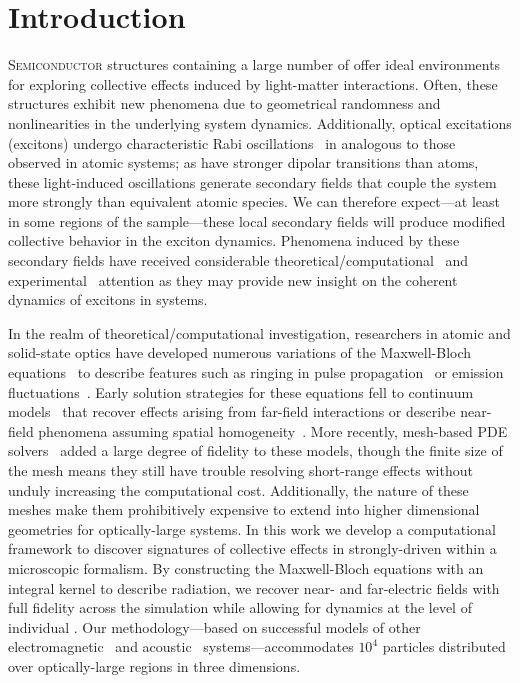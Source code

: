 \section{\label{section:introduction}Introduction}

\lettrine[lines=3, depth=1]{S}{emiconductor} structures containing a large number of \qds{} offer ideal environments for exploring collective effects induced by light-matter interactions.
Often, these structures exhibit new phenomena due to geometrical randomness and nonlinearities in the underlying system dynamics.
Additionally, optical excitations (excitons) undergo characteristic Rabi oscillations~\cite{Stievater2001,Kamada2001,Htoon2002} in \qds{} analogous to those observed in atomic systems; as \qds{} have stronger dipolar transitions than atoms, these light-induced oscillations generate secondary fields that couple the system more strongly than equivalent atomic species.
We can therefore expect---at least in some regions of the sample---these local secondary fields will produce modified collective behavior in the exciton dynamics.
Phenomena induced by these secondary fields have received considerable theoretical/computational~\cite{Slepyan2002,Slepyan2004} and experimental~\cite{Asakura2013} attention as they may provide new insight on the coherent dynamics of excitons in \qd{} systems.

In the realm of theoretical/computational investigation, researchers in atomic and solid-state optics have developed numerous variations of the Maxwell-Bloch equations~\cite{Gross1982} to describe features such as ringing in pulse propagation~\cite{Burnham1969,MacGillivray1976} or emission fluctuations~\cite{Haake1979}.
Early solution strategies for these equations fell to continuum models~\cite{Rehler1971,MacGillivray1976} that recover effects arising from far-field interactions or describe near-field phenomena assuming spatial homogeneity~\cite{Stroud1972}.
More recently, mesh-based PDE solvers~\cite{Vanneste2001,Fratalocchi2008,Bachelard2015} added a large degree of fidelity to these models, though the finite size of the mesh means they still have trouble resolving short-range effects without unduly increasing the computational cost.
Additionally, the nature of these meshes make them prohibitively expensive to extend into higher dimensional geometries for optically-large systems.
In this work we develop a computational framework to discover signatures of collective effects in strongly-driven \qds{} within a microscopic formalism.
By constructing the Maxwell-Bloch equations with an integral kernel to describe radiation, we recover near- and far-electric fields with full fidelity across the simulation while allowing for dynamics at the level of individual \qds{}.
Our methodology---based on successful models of other electromagnetic~\cite{Shanker2000,Pray2012,Pray2014} and acoustic~\cite{Ergin1999a,Ergin1999b,Glosser2016} systems---accommodates $10^4$ particles distributed over optically-large regions in three dimensions.


